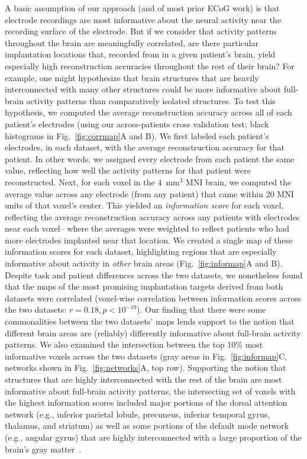 \documentclass[11pt]{article}
\begin{document}
A basic assumption of our approach (and of most prior ECoG work) is that
electrode recordings are most informative about the neural activity near the
recording surface of the electrode.  But if we consider that activity patterns
throughout the brain are meaningfully correlated, are there particular
implantation locations that, recorded from in a given patient's brain, yield
especially high reconstruction accuracies throughout the rest of their brain?
For example, one might hypothesize that brain structures that are heavily
interconnected with many other structures could be more informative about
full-brain activity patterns than comparatively isolated structures.  To test
this hypothesis, we computed the average reconstruction accuracy across all of
each patient's electrodes (using our across-patients cross validation test;
black histograms in Fig.~\ref{fig:corrmap}A and B).  We first labeled each
patient's electrodes, in each dataset, with the average reconstruction accuracy
for that patient.  In other words, we assigned every electrode from each patient
the same value, reflecting how well the activity patterns for that patient were
reconstructed. Next, for each voxel in the 4~mm$^3$ MNI brain, we computed the
average value across any electrode (from any patient) that came within 20 MNI
units of that voxel's center.  This yielded an \textit{information score} for
each voxel, reflecting the average reconstruction accuracy across any patients
with electrodes near each voxel-- where the averages were weighted to reflect
patients who had more electrodes implanted near that location. We created a
single map of these information scores for each dataset, highlighting regions
that are especially informative about activity in \textit{other} brain areas
(Fig.~\ref{fig:informap}A and B).  Despite task and patient differences across
the two datasets, we nonetheless found that the maps of the most promising
implantation targets derived from both datasets were correlated (voxel-wise
correlation between information scores across the two datasets: $r = 0.18, p <
10^{-10}$).  Our finding that there were some commonalities between the two
datasets' maps lends support to the notion that different brain areas are
(reliably) differently informative about full-brain activity patterns.  We also
examined the intersection between the top 10\% most informative voxels across
the two datasets (gray areas in Fig.~\ref{fig:informap}C, networks shown in
Fig.~\ref{fig:networks}A, top row). Supporting the notion that structures that
are highly interconnected with the rest of the brain are most informative about
full-brain activity patterns, the intersecting set of voxels with the highest
information scores included major portions of the dorsal attention network
(e.g., inferior parietal lobule, precuneus, inferior temporal gyrus, thalamus,
and striatum) as well as some portions of the default mode network (e.g.,
angular gyrus) that are highly interconnected with a large proportion of the
brain's gray matter~\citep[e.g.,][]{TomaVolk11}.
\end{document}
